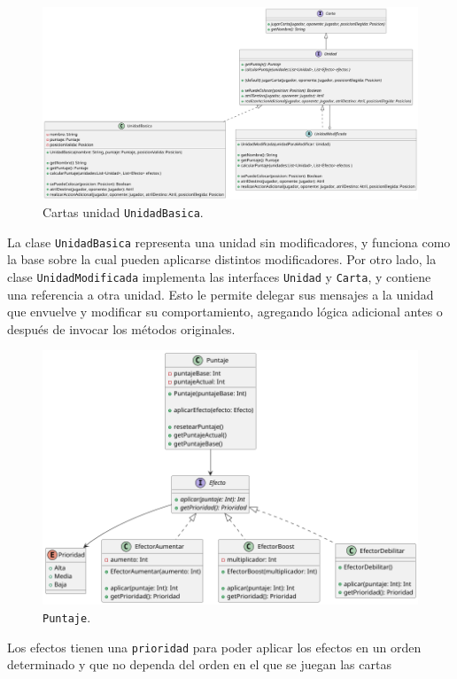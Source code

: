 \documentclass[titlepage,a4paper]{article}
\begin{document}
	\begin{figure}[H]
		\centering
		\includegraphics[width=1\textwidth]{diagramas/clases/UnidadBasica}
		\caption{\label{fig:class06}Cartas unidad \texttt{UnidadBasica}.}
	\end{figure}

	La clase \texttt{UnidadBasica} representa una unidad sin modificadores, y funciona como la base sobre la cual pueden aplicarse distintos modificadores.
	Por otro lado, la clase \texttt{UnidadModificada} implementa las interfaces \texttt{Unidad} y \texttt{Carta}, y contiene una referencia a otra unidad.
	Esto le permite delegar sus mensajes a la unidad que envuelve y modificar su comportamiento, agregando lógica adicional antes o después de invocar los métodos originales.

	\begin{figure}[H]
		\centering
		\includegraphics[width=1\textwidth]{diagramas/clases/Puntaje}
		\caption{\label{fig:class07}\texttt{Puntaje}.}
	\end{figure}
	Los efectos tienen una \texttt{prioridad} para poder aplicar los efectos en un orden determinado y que no dependa del orden en el que se juegan las cartas
\end{document}
